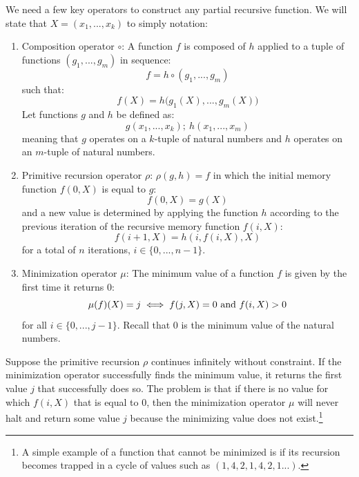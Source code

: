 \documentclass[10pt, a5paper, twoside, openright]{memoir}
\begin{document}
We need a few key operators to construct any partial recursive function. We will state that $X = (x_1,...,x_k)$ to simply notation:
\begin{enumerate}
\item Composition operator $\circ$: A function $f$ is composed of $h$ applied to a tuple of functions $(g_1,...,g_m)$ in sequence: 
$$f = h \circ (g_1,...,g_m)$$
such that:
$$f(X) = h \big ( g_1(X),...,g_m(X) \big )$$ 
Let functions $g$ and $h$ be defined as:
$$g(x_1,...,x_k); \ h(x_1,...,x_m)$$
meaning that $g$ operates on a $k$-tuple of natural numbers and $h$ operates on an $m$-tuple of natural numbers.
\item Primitive recursion operator $\rho$: $\rho(g, h) = f$ in which the initial memory function $f(0, X)$ is equal to $g$:
$$f(0, X) = g(X)$$ 
and a new value is determined by applying the function $h$ according to the previous iteration of the recursive memory function $f(i, X)$:
$$f(i+1, X) = h(i, f(i, X), X)$$ 
for a total of $n$ iterations, $i \in \{0,...,n-1\}$.
\item Minimization operator $\mu$: The minimum value of a function $f$ is given by the first time it returns $0$:
$$ \mu (f)(X) = j \iff f(j, X) = 0 \ \textnormal{and} \ f(i, X) > 0$$
for all $i \in \{0,...,j-1\}$. Recall that $0$ is the minimum value of the natural numbers.
\end{enumerate}
Suppose the primitive recursion $\rho$ continues infinitely without constraint. If the minimization operator successfully finds the minimum value, it returns the first value $j$ that successfully does so. The problem is that if there is no value for which $f(i, X)$ that is equal to $0$, then the minimization operator $\mu$ will never halt and return some value $j$ because the minimizing value does not exist.\footnote{A simple example of a function that cannot be minimized is if its recursion becomes trapped in a cycle of values such as $(1, 4, 2, 1, 4, 2, 1 . . .)$.}
\end{document}
